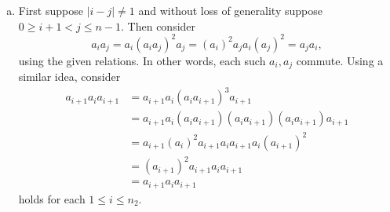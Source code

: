 \documentclass[12pt,letterpaper,boxed]{hmcpset}
\newcommand{\abs}[1]{\left|#1\right|}
\begin{document}
\begin{solution}
\begin{enumerate}[(a)]
\item 
First suppose $\abs{i -j} \neq 1$ and without loss of generality
suppose $0 \geq i+1 < j \leq n-1$. Then consider 
\[
	a_i a_j = a_i (a_ia_j)^2 a_j = (a_i)^2 a_j a_i (a_j)^2 = a_j a_i,
\]
using the given relations. In other words, each such $a_i, a_j$
commute. Using a similar idea, consider 
\begin{align*}
	a_{i+1}a_i a_{i+1} 
		&= a_{i+1} a_i (a_ia_{i+1})^3 a_{i+1} \\
		&= a_{i+1} a_i (a_ia_{i+1}) (a_ia_{i+1})(a_ia_{i+1}) a_{i+1} \\
		&= a_{i+1} (a_i)^2 a_{i+1} a_i a_{i+1} a_i (a_{i+1})^2  \\
	 	&= (a_{i+1})^2 a_{i+1}a_i a_{i+1} \\
	 	&= a_{i+1}a_i a_{i+1}
\end{align*}
holds for each $1 \leq i \leq n_2$. 


\end{enumerate}
\end{solution}

\newpage
\end{document}
